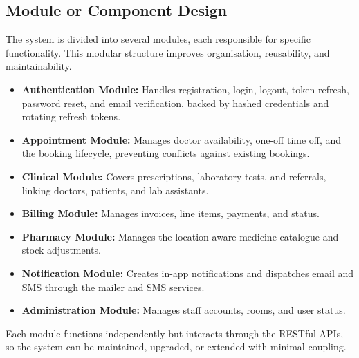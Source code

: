 \documentclass[12pt,a4paper]{report}
\begin{document}
\subsection{Module or Component Design}
The system is divided into several modules, each responsible for specific
functionality. This modular structure improves organisation, reusability, and
maintainability.
\begin{itemize}[leftmargin=1.4em]
  \item \textbf{Authentication Module:} Handles registration, login, logout, token
        refresh, password reset, and email verification, backed by hashed credentials
        and rotating refresh tokens.
  \item \textbf{Appointment Module:} Manages doctor availability, one-off time off, and
        the booking lifecycle, preventing conflicts against existing bookings.
  \item \textbf{Clinical Module:} Covers prescriptions, laboratory tests, and referrals,
        linking doctors, patients, and lab assistants.
  \item \textbf{Billing Module:} Manages invoices, line items, payments, and status.
  \item \textbf{Pharmacy Module:} Manages the location-aware medicine catalogue and
        stock adjustments.
  \item \textbf{Notification Module:} Creates in-app notifications and dispatches email
        and SMS through the mailer and SMS services.
  \item \textbf{Administration Module:} Manages staff accounts, rooms, and user status.
\end{itemize}
Each module functions independently but interacts through the RESTful APIs, so the
system can be maintained, upgraded, or extended with minimal coupling.
\end{document}

